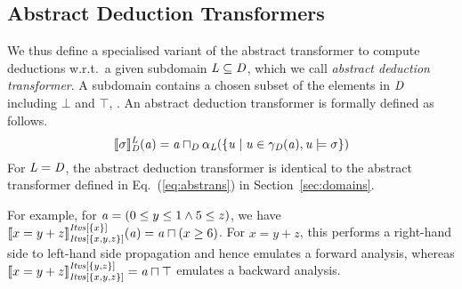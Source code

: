 \subsection{Abstract Deduction Transformers} \label{sec:abst}
%
We thus define a specialised variant of the abstract transformer to compute
deductions w.r.t.\ a given subdomain $\subdomain\subseteq \domain$,
which we call \emph{abstract deduction transformer}.
%
A subdomain contains a chosen subset of the elements in $\domain$ including
$\bot$ and $\top$, .  An abstract 
deduction transformer is formally defined as follows. 
\begin{equation}\label{eq:at2}
\abstrans{\domain}{\constraint}^\subdomain(\absval)=\absval\meet_\domain \alpha_\subdomain(\{\val\mid \val\in\gamma_\domain(\absval), \val\models \constraint\})
\end{equation}
For $\subdomain=\domain$, the abstract deduction transformer is identical 
to the abstract transformer defined in Eq.~(\ref{eq:abstrans})
in Section~\ref{sec:domains}.

%

%
For example, for $\absval=(0\leq y \leq 1 \wedge 5\leq z)$, we have
$\abstrans{\intervals[\{x,y,z\}]}{x=y+z}^{\intervals[\{x\}]}(\absval)=\absval\meet(x\geq
6)$. For $x=y+z$, this performs a right-hand side to left-hand side propagation and
hence emulates a forward analysis, whereas
$\abstrans{\intervals[\{x,y,z\}]}{x=y+z}^{\intervals[\{y,z\}]}=\absval\meet\top$
emulates a backward analysis.

